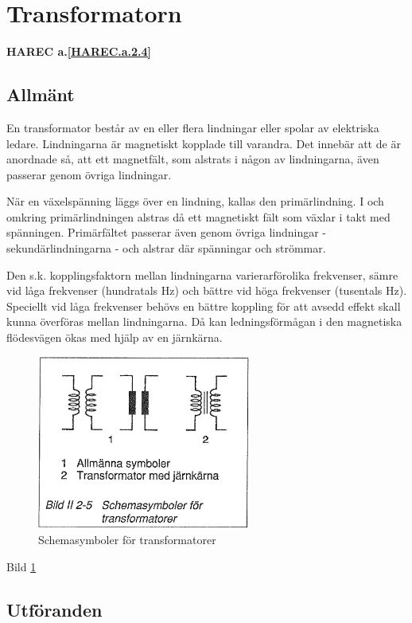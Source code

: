\section{Transformatorn}
\textbf{HAREC a.\ref{HAREC.a.2.4}\label{myHAREC.a.2.4}}
\label{transformatorn}

\subsection{Allmänt}

En transformator består av en eller flera lindningar eller spolar av elektriska
ledare. Lindningarna är magnetiskt kopplade till varandra. Det innebär att de är
anordnade så, att ett magnetfält, som alstrats i någon av lindningarna, även
passerar genom övriga lindningar.

När en växelspänning läggs över en lindning, kallas den primärlindning. I och
omkring primärlindningen alstras då ett magnetiskt fält som växlar i takt med
spänningen. Primärfältet passerar även genom övriga lindningar -
sekundärlindningarna - och alstrar där spänningar och strömmar.

Den s.k. kopplingsfaktorn mellan lindningarna varierarförolika frekvenser, sämre
vid låga frekvenser (hundratals Hz) och bättre vid höga frekvenser (tusentals
Hz). Speciellt vid låga frekvenser behövs en bättre koppling för att avsedd
effekt skall kunna överföras mellan lindningarna. Då kan ledningsförmågan i den
magnetiska flödesvägen ökas med hjälp av en järnkärna.

\begin{figure}[h]
\begin{center}
\includegraphics[width=7cm]{images/bild_2_2-05}
\caption{Schemasymboler för transformatorer}
\label{fig:BildII2-5}
\end{center}
\end{figure}

Bild \ref{fig:BildII2-5}

\subsection{Utföranden}

